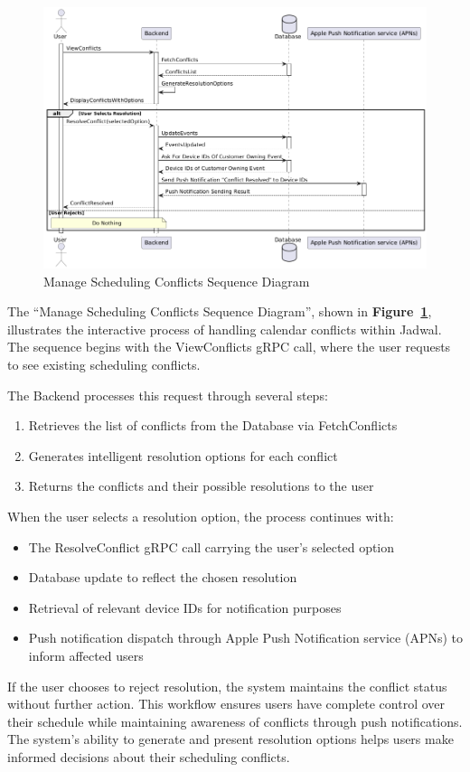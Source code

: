 \begin{figure}[!h]
  \centering
  \includegraphics[width=\textwidth]{images/docs/diagrams/sequence-diagrams/all-sequence-diagrams/Manage Scheduling Conflicts.png}
  \caption{Manage Scheduling Conflicts Sequence Diagram}
  \label{fig:seq/manage-scheduling-conflicts}
\end{figure}

The ``Manage Scheduling Conflicts Sequence Diagram'', shown in \textbf{Figure~\ref{fig:seq/manage-scheduling-conflicts}}, illustrates the interactive process of handling calendar conflicts within Jadwal. The sequence begins with the ViewConflicts gRPC call, where the user requests to see existing scheduling conflicts.

The Backend processes this request through several steps:
\begin{enumerate}
  \item Retrieves the list of conflicts from the Database via FetchConflicts
  \item Generates intelligent resolution options for each conflict
  \item Returns the conflicts and their possible resolutions to the user
\end{enumerate}

When the user selects a resolution option, the process continues with:
\begin{itemize}
  \item The ResolveConflict gRPC call carrying the user's selected option
  \item Database update to reflect the chosen resolution
  \item Retrieval of relevant device IDs for notification purposes
  \item Push notification dispatch through Apple Push Notification service (APNs) to inform affected users
\end{itemize}

If the user chooses to reject resolution, the system maintains the conflict status without further action. This workflow ensures users have complete control over their schedule while maintaining awareness of conflicts through push notifications. The system's ability to generate and present resolution options helps users make informed decisions about their scheduling conflicts.